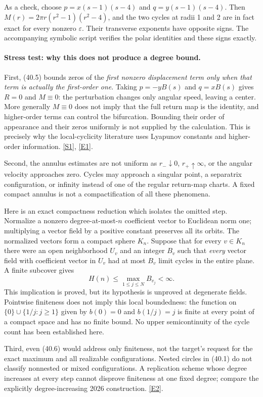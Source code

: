 \documentclass[11pt,a4paper]{article}
\newcommand{\sref}[2]{\hyperlink{source:#1:#2}{[S#2]}}
\newcommand{\eref}[2]{\hyperlink{extra:#1:#2}{[E#2]}}
\numberwithin{equation}{section}
\begin{document}
As a check, choose $p=x(s-1)(s-4)$ and $q=y(s-1)(s-4)$.
Then $M(r)=2\pi r(r^2-1)(r^2-4)$, and the two cycles at radii
1 and 2 are in fact exact for every nonzero $\varepsilon$. Their transverse
exponents have opposite signs. The accompanying symbolic script verifies
the polar identities and these signs exactly.

\paragraph{Stress test: why this does not produce a degree bound.}
First, (40.5) bounds zeros of the \emph{first nonzero displacement term
only when that term is actually the first-order one}. Taking
$p=-yB(s)$ and $q=xB(s)$ gives $R=0$ and $M\equiv0$: the perturbation
changes only angular speed, leaving a center. More generally $M\equiv0$
does not imply that the full return map is the identity, and higher-order
terms can control the bifurcation. Bounding their order of appearance and
their zeros uniformly is not supplied by the calculation. This is precisely
why the local-cyclicity literature uses Lyapunov constants and higher-order
information. \sref{1162}{1}, \eref{1162}{1}.

Second, the annulus estimates are not uniform as $r_-\downarrow0$,
$r_+\uparrow\infty$, or the angular velocity approaches zero. Cycles may
approach a singular point, a separatrix configuration, or infinity instead
of one of the regular return-map charts. A fixed compact annulus is not a
compactification of all these phenomena.

Here is an exact compactness reduction which isolates the omitted step.
Normalize a nonzero degree-at-most-$n$ coefficient vector to Euclidean norm
one; multiplying a vector field by a positive constant preserves all its
orbits. The normalized vectors form a compact sphere $K_n$. Suppose that
for every $v\in K_n$ there were an open neighborhood $U_v$ and an integer
$B_v$ such that \emph{every} vector field with coefficient vector in $U_v$
had at most $B_v$ limit cycles in the entire plane. A finite subcover gives
\[
 H(n)\le\max_{1\le j\le N}B_{v_j}<\infty.           \tag{40.6}
\]
This implication is proved, but its hypothesis is unproved at degenerate
fields. Pointwise finiteness does not imply this local boundedness: the
function on $\{0\}\cup\{1/j:j\ge1\}$ given by $b(0)=0$ and $b(1/j)=j$
is finite at every point of a compact space and has no finite bound.
No upper semicontinuity of the cycle count has been established here.

Third, even (40.6) would address only finiteness, not the target's request
for the exact maximum and all realizable configurations. Nested circles
in (40.1) do not classify nonnested or mixed configurations. A replication
scheme whose degree increases at every step cannot disprove finiteness at
one fixed degree; compare the explicitly degree-increasing 2026
construction. \eref{1162}{2}.
\end{document}
